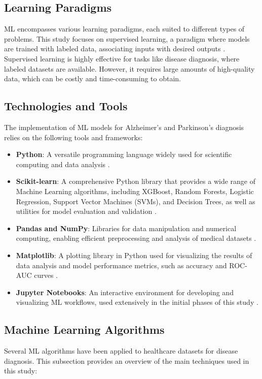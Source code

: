 \documentclass[conference]{IEEEtran}
\begin{document}
\subsection{Learning Paradigms}
ML encompasses various learning paradigms, each suited to different types of problems. This study focuses on supervised learning, a paradigm where models are trained with labeled data, associating inputs with desired outputs \cite{b2}. Supervised learning is highly effective for tasks like disease diagnosis, where labeled datasets are available. However, it requires large amounts of high-quality data, which can be costly and time-consuming to obtain.

\subsection{Technologies and Tools}
The implementation of ML models for Alzheimer’s and Parkinson’s diagnosis relies on the following tools and frameworks:
\begin{itemize}
    \item \textbf{Python}: A versatile programming language widely used for scientific computing and data analysis \cite{b3}.
    \item \textbf{Scikit-learn}: A comprehensive Python library that provides a wide range of Machine Learning algorithms, including XGBoost, Random Forests, Logistic Regression, Support Vector Machines (SVMs), and Decision Trees, as well as utilities for model evaluation and validation \cite{b1, b2}.
    \item \textbf{Pandas and NumPy}: Libraries for data manipulation and numerical computing, enabling efficient preprocessing and analysis of medical datasets \cite{b1}.
    \item \textbf{Matplotlib}: A plotting library in Python used for visualizing the results of data analysis and model performance metrics, such as accuracy and ROC-AUC curves \cite{b14}.
    \item \textbf{Jupyter Notebooks}: An interactive environment for developing and visualizing ML workflows, used extensively in the initial phases of this study \cite{b2}.
\end{itemize}

\subsection{Machine Learning Algorithms}
Several ML algorithms have been applied to healthcare datasets for disease diagnosis. This subsection provides an overview of the main techniques used in this study:
\end{document}
